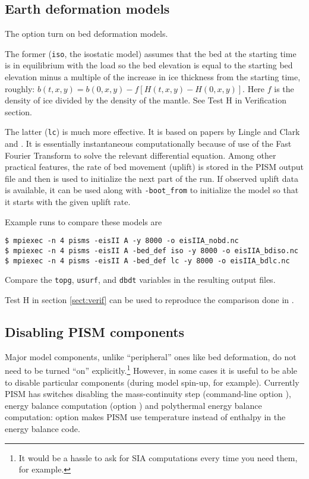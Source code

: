 \subsection{Earth deformation models} \label{subsect:beddef}  

The option  turn on bed deformation models.

The former (\texttt{iso}, the isostatic model) assumes that the bed at the starting time is in equilibrium with the load so the bed elevation is equal to the starting bed elevation minus a multiple of the increase in ice thickness from the starting time, roughly: $b(t,x,y) = b(0,x,y) - f [H(t,x,y) - H(0,x,y)]$.  Here $f$ is the density of ice divided by the density of the mantle.  See Test H in Verification section. 

The latter (\texttt{lc}) is much more effective.  It is based on papers by Lingle and Clark \cite{LingleClark}  and \cite{BLKfastearth}.  It is essentially instantaneous computationally because of use of the Fast Fourier Transform to solve the relevant differential equation.  Among other practical features, the rate of bed movement (uplift) is stored in the PISM output file and then is used to initialize the next part of the run.  If observed uplift data is available, it can be used along with \texttt{-boot_from} to initialize the model so that it starts with the given uplift rate.

Example runs to compare these models are
\begin{verbatim}
$ mpiexec -n 4 pisms -eisII A -y 8000 -o eisIIA_nobd.nc
$ mpiexec -n 4 pisms -eisII A -bed_def iso -y 8000 -o eisIIA_bdiso.nc
$ mpiexec -n 4 pisms -eisII A -bed_def lc -y 8000 -o eisIIA_bdlc.nc
\end{verbatim}
Compare the \texttt{topg}, \texttt{usurf}, and \texttt{dbdt} variables in the resulting output files.

Test H in section \ref{sect:verif} can be used to reproduce the comparison done in \cite{BLKfastearth}.

\subsection{Disabling PISM components}
\label{sec:turning-off}

Major model components, unlike ``peripheral'' ones like bed deformation, do not need to be turned ``on'' explicitly.\footnote{It would be a hassle to ask for SIA computations every time you need them, for example.} However, in some cases it is useful to be able to disable particular components (during model spin-up, for example). Currently PISM has switches disabling the mass-continuity step (command-line option ), energy balance computation (option ) and polythermal energy balance computation: option  makes PISM use temperature instead of enthalpy in the energy balance code.


